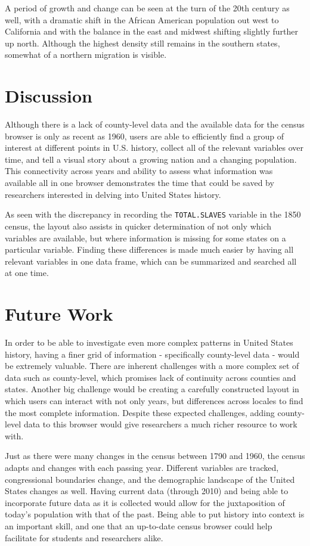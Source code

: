 \documentclass[11pt,]{article}
\begin{document}
A period of growth and change can be seen at the turn of the 20th
century as well, with a dramatic shift in the African American
population out west to California and with the balance in the east and
midwest shifting slightly further up north. Although the highest density
still remains in the southern states, somewhat of a northern migration
is visible.

\section{Discussion}

Although there is a lack of county-level data and the available data for
the census browser is only as recent as 1960, users are able to
efficiently find a group of interest at different points in U.S.
history, collect all of the relevant variables over time, and tell a
visual story about a growing nation and a changing population. This
connectivity across years and ability to assess what information was
available all in one browser demonstrates the time that could be saved
by researchers interested in delving into United States history.

As seen with the discrepancy in recording the \texttt{TOTAL.SLAVES}
variable in the 1850 census, the layout also assists in quicker
determination of not only which variables are available, but where
information is missing for some states on a particular variable. Finding
these differences is made much easier by having all relevant variables
in one data frame, which can be summarized and searched all at one time.

\section{Future Work}

In order to be able to investigate even more complex patterns in United
States history, having a finer grid of information - specifically
county-level data - would be extremely valuable. There are inherent
challenges with a more complex set of data such as county-level, which
promises lack of continuity across counties and states. Another big
challenge would be creating a carefully constructed layout in which
users can interact with not only years, but differences across locales
to find the most complete information. Despite these expected
challenges, adding county-level data to this browser would give
researchers a much richer resource to work with.

Just as there were many changes in the census between 1790 and 1960, the
census adapts and changes with each passing year. Different variables
are tracked, congressional boundaries change, and the demographic
landscape of the United States changes as well. Having current data
(through 2010) and being able to incorporate future data as it is
collected would allow for the juxtaposition of today's population with
that of the past. Being able to put history into context is an important
skill, and one that an up-to-date census browser could help facilitate
for students and researchers alike.
\end{document}
